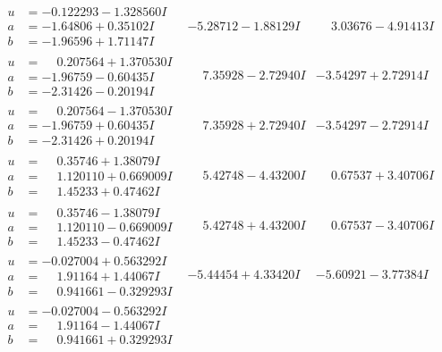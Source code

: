 \documentclass[1p]{elsarticle_modified}
\theoremstyle{definition}
\begin{document}
$$\begin{array}{c|c|c}
\begin{aligned}
u &= -0.122293 - 1.328560 I \\
a &= -1.64806 + 0.35102 I \\
b &= -1.96596 + 1.71147 I\end{aligned}
 & -5.28712 - 1.88129 I & \phantom{-}3.03676 - 4.91413 I \\ \hline\begin{aligned}
u &= \phantom{-}0.207564 + 1.370530 I \\
a &= -1.96759 - 0.60435 I \\
b &= -2.31426 - 0.20194 I\end{aligned}
 & \phantom{-}7.35928 - 2.72940 I & -3.54297 + 2.72914 I \\ \hline\begin{aligned}
u &= \phantom{-}0.207564 - 1.370530 I \\
a &= -1.96759 + 0.60435 I \\
b &= -2.31426 + 0.20194 I\end{aligned}
 & \phantom{-}7.35928 + 2.72940 I & -3.54297 - 2.72914 I \\ \hline\begin{aligned}
u &= \phantom{-}0.35746 + 1.38079 I \\
a &= \phantom{-}1.120110 + 0.669009 I \\
b &= \phantom{-}1.45233 + 0.47462 I\end{aligned}
 & \phantom{-}5.42748 - 4.43200 I & \phantom{-}0.67537 + 3.40706 I \\ \hline\begin{aligned}
u &= \phantom{-}0.35746 - 1.38079 I \\
a &= \phantom{-}1.120110 - 0.669009 I \\
b &= \phantom{-}1.45233 - 0.47462 I\end{aligned}
 & \phantom{-}5.42748 + 4.43200 I & \phantom{-}0.67537 - 3.40706 I \\ \hline\begin{aligned}
u &= -0.027004 + 0.563292 I \\
a &= \phantom{-}1.91164 + 1.44067 I \\
b &= \phantom{-}0.941661 - 0.329293 I\end{aligned}
 & -5.44454 + 4.33420 I & -5.60921 - 3.77384 I \\ \hline\begin{aligned}
u &= -0.027004 - 0.563292 I \\
a &= \phantom{-}1.91164 - 1.44067 I \\
b &= \phantom{-}0.941661 + 0.329293 I\end{aligned}

\end{array}$$
\end{document}
